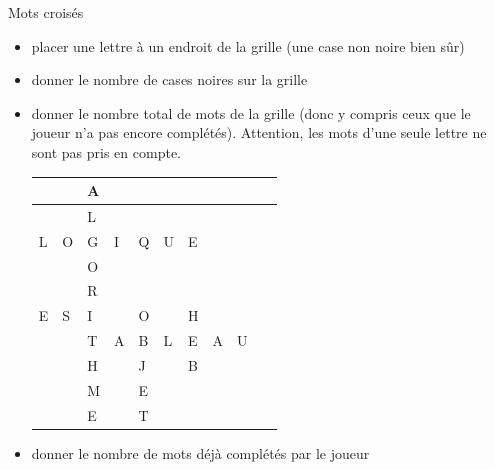 \begin{Exercice}{Mots croisés}
	\liststyleListi
	\begin{itemize}
		\item 
			placer une lettre à un endroit de la grille (une case non noire bien
			sûr)
		\item 
			donner le nombre de cases noires sur la grille
		\item 
			donner le nombre total de mots de la grille (donc y compris ceux que le
			joueur n’a pas encore complétés). Attention, les mots
			d'une seule lettre ne sont pas pris en compte.
			\begin{center}
			\begin{minipage}{5.749cm}
			\begin{center}
			\tablehead{}
			\begin{supertabular}{|m{0.37cm}|m{0.37cm}|m{0.37cm}|m{0.37cm}|m{0.37cm}|m{0.37cm}|m{0.37cm}|m{0.37cm}|m{0.37cm}|m{0.41900003cm}|}
			\hline
			~
			 &
			~
			 &
			\centering  A &
			~
			 &
			~
			 &
			~
			 &
			~
			 &
			~
			 &
			~
			 &
			~
			\\\hline
			~
			 &
			~
			 &
			\centering  L &
			~
			 &
			~
			 &
			~
			 &
			~
			 &
			~
			 &
			~
			 &
			~
			\\\hline
			\centering  L &
			\centering  O &
			\centering  G &
			\centering  I &
			\centering  Q &
			\centering  U &
			\centering  E &
			~
			 &
			~
			 &
			~
			\\\hline
			~
			 &
			~
			 &
			\centering  O &
			~
			 &
			~
			 &
			~
			 &
			~
			 &
			~
			 &
			~
			 &
			~
			\\\hline
			~
			 &
			~
			 &
			\centering  R &
			~
			 &
			~
			 &
			~
			 &
			~
			 &
			~
			 &
			~
			 &
			~
			\\\hline
			\centering  E &
			\centering  S &
			\centering  I &
			~
			 &
			\centering  O &
			~
			 &
			\centering  H &
			~
			 &
			~
			 &
			~
			\\\hline
			~
			 &
			~
			 &
			\centering  T &
			\centering  A &
			\centering  B &
			\centering  L &
			\centering  E &
			\centering  A &
			\centering  U &
			~
			\\\hline
			~
			 &
			~
			 &
			\centering  H &
			~
			 &
			\centering  J &
			~
			 &
			\centering  B &
			~
			 &
			~
			 &
			~
			\\\hline
			~
			 &
			~
			 &
			\centering  M &
			~
			 &
			\centering  E &
			~
			 &
			~
			 &
			~
			 &
			~
			 &
			~
			\\\hline
			~
			 &
			~
			 &
			\centering  E &
			~
			 &
			\centering  T &
			~
			 &
			~
			 &
			~
			 &
			~
			 &
			~
			\\\hline
			\end{supertabular}
			\end{center}
			\end{minipage}
			\end{center}
		\item 
			donner le nombre de mots déjà complétés par le joueur
	\end{itemize}


\end{Exercice}
